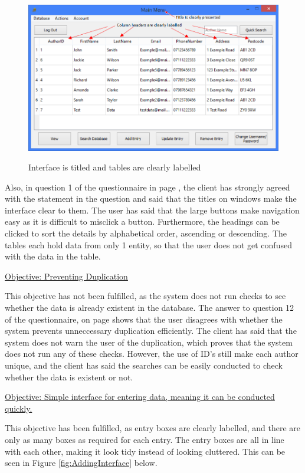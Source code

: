 \begin{figure}[H]
    \includegraphics[width=\textwidth]{./Evaluation/Evidence/Clarity.png}
    \label{fig:InterfaceClarity} \caption{Interface is titled and tables are clearly labelled}
\end{figure}

Also, in question 1 of the questionnaire in page \pageref{fig:Questionnaire1}, the client has strongly agreed with the statement in the question and said that the titles on windows make the interface clear to them. The user has said that the large buttons make navigation easy as it is difficult to misclick a button. Furthermore, the headings can be clicked to sort the details by alphabetical order, ascending or descending. The tables each hold data from only 1 entity, so that the user does not get confused with the data in the table.


\underline{Objective: Preventing Duplication}

This objective has not been fulfilled, as the system does not run checks to see whether the data is already existent in the database. The answer to question 12 of the questionnaire, on page \pageref{fig:Questionnaire2} shows that the user disagrees with whether the system prevents unneccessary duplication efficiently. The client has said that the system does not warn the user of the duplication, which proves that the system does not run any of these checks. However, the use of ID's still make each author unique, and the client has said the searches can be easily conducted to check whether the data is existent or not. 


\underline{Objective: Simple interface for entering data, meaning it can be conducted quickly.}

This objective has been fulfilled, as entry boxes are clearly labelled, and there are only as many boxes as required for each entry. The entry boxes are all in line with each other, making it look tidy instead of looking cluttered. This can be seen in Figure \ref{fig:AddingInterface} below.

